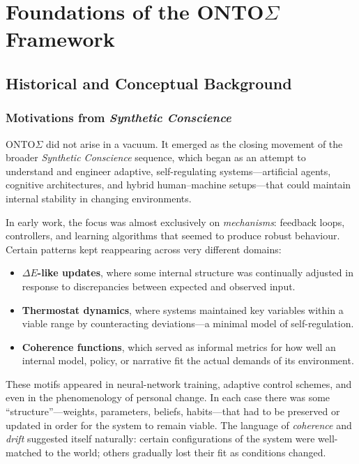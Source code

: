 \documentclass[12pt,a4paper]{report}
\begin{document}
\clearpage



\part{Foundations of the ONTO$\Sigma$ Framework}

\chapter{Historical and Conceptual Background}

\section{Motivations from \emph{Synthetic Conscience}}

ONTO$\Sigma$ did not arise in a vacuum. It emerged as the closing movement of the broader \emph{Synthetic Conscience} sequence, which began as an attempt to understand and engineer adaptive, self-regulating systems---artificial agents, cognitive architectures, and hybrid human--machine setups---that could maintain internal stability in changing environments.

In early work, the focus was almost exclusively on \emph{mechanisms}: feedback loops, controllers, and learning algorithms that seemed to produce robust behaviour. Certain patterns kept reappearing across very different domains:

\begin{itemize}[leftmargin=2em]
    \item \textbf{$\Delta E$-like updates}, where some internal structure was continually adjusted in response to discrepancies between expected and observed input.
    \item \textbf{Thermostat dynamics}, where systems maintained key variables within a viable range by counteracting deviations---a minimal model of self-regulation.
    \item \textbf{Coherence functions}, which served as informal metrics for how well an internal model, policy, or narrative fit the actual demands of its environment.
\end{itemize}

These motifs appeared in neural-network training, adaptive control schemes, and even in the phenomenology of personal change. In each case there was some ``structure''---weights, parameters, beliefs, habits---that had to be preserved or updated in order for the system to remain viable. The language of \emph{coherence} and \emph{drift} suggested itself naturally: certain configurations of the system were well-matched to the world; others gradually lost their fit as conditions changed.
\end{document}
